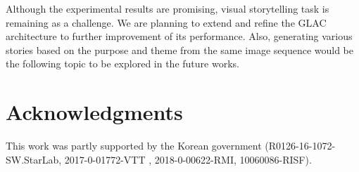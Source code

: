 \documentclass[11pt,a4paper]{article}
\begin{document}
Although the experimental results are promising, visual storytelling task is remaining as a challenge.
We are planning to extend and refine the GLAC architecture to further improvement of its performance.
Also, generating various stories based on the purpose and theme from the same image sequence would be the following topic to be explored in the future works.




\section*{Acknowledgments}

This work was partly supported by the Korean government (R0126-16-1072-SW.StarLab, 2017-0-01772-VTT , 2018-0-00622-RMI, 10060086-RISF).











\end{document}
